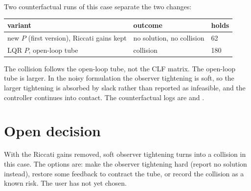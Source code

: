 \documentclass[11pt]{article}
\begin{document}
Two counterfactual runs of this case separate the two changes:
\begin{center}
\begin{tabular}{lll}
\toprule
variant & outcome & holds\\
\midrule
new $P$ (first version), Riccati gains kept & no solution, no collision & 62\\
LQR $P$, open-loop tube & collision & 180\\
\bottomrule
\end{tabular}
\end{center}
The collision follows the open-loop tube, not the CLF matrix. The open-loop
tube is larger. In the noisy formulation the observer tightening is soft, so
the larger tightening is absorbed by slack rather than reported as infeasible,
and the controller continues into contact. The counterfactual logs are
 and .

\section{Open decision}
With the Riccati gains removed, soft observer tightening turns into a
collision in this case. The options are: make the observer tightening hard
(report no solution instead), restore some feedback to contract the tube, or
record the collision as a known risk. The user has not yet chosen.
\end{document}
